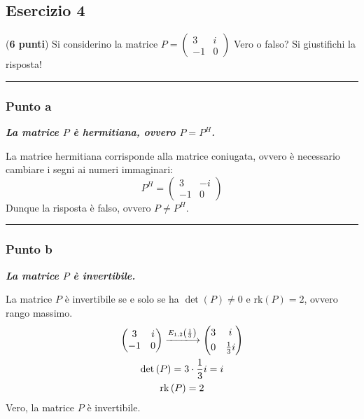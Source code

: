 \documentclass[a4paper]{article}
\makeatletter
\newcommand{\longline}{\noindent\rule{\textwidth}{0.4pt}}
\newenvironment{rowequmat}[1]{\left(\array{@{}#1@{}}}{\endarray\right)}
\makeatother
\begin{document}
	\subsection{Esercizio 4}
	
	(\textbf{6 punti}) Si considerino la matrice $P = \begin{pmatrix}
		3 & i \\
		-1 & 0
	\end{pmatrix}$ Vero o falso? Si giustifichi la risposta!
	
	\longline
	
	\subsubsection{Punto a}
	
	\textcolor{Green4}{\textbf{\emph{La matrice $P$ è hermitiana, ovvero $P = P^{H}$.}}}\newline
	
	\noindent
	La matrice hermitiana corrisponde alla matrice coniugata, ovvero è necessario cambiare i segni ai numeri immaginari:
	\begin{equation*}
		P^{H} = \begin{pmatrix}
			3 & -i \\ -1 & 0
		\end{pmatrix}
	\end{equation*}
	Dunque la risposta è falso, ovvero $P \ne P^{H}$.
	
	\longline
	
	\subsubsection{Punto b}
	
	\textcolor{Green4}{\textbf{\emph{La matrice $P$ è invertibile.}}}\newline
	
	\noindent
	La matrice $P$ è invertibile se e solo se ha $\det\left(P\right) \ne 0$ e $\mathrm{rk}\left(P\right) = 2$, ovvero rango massimo.
	\begin{gather*}
		\begin{pmatrix}
			3 & i \\
			-1 & 0
		\end{pmatrix}
		\xlongrightarrow{E_{1,2}\left(\frac{1}{3}\right)}
		\begin{rowequmat}{cc}
			3 & i \\ [.3em]
			0 & \frac{1}{3}i
		\end{rowequmat} \\
		\det\left(P\right) = 3 \cdot \dfrac{1}{3}i = i \\
		\mathrm{rk}\left(P\right) = 2
	\end{gather*}
	Vero, la matrice $P$ è invertibile.
	
\end{document}
